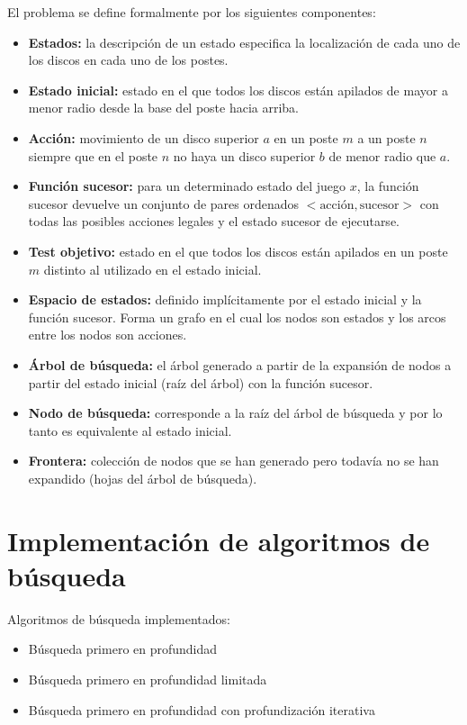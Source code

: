 \documentclass[onecolumn]{IEEEtran}
\begin{document}
El problema se define formalmente por los siguientes componentes:
\begin{itemize}
    \item \textbf{Estados:} la descripción de un estado especifica la localización de cada uno de los discos en cada uno de los postes.
    \item \textbf{Estado inicial:} estado en el que todos los discos están apilados de mayor a menor radio desde la base del poste hacia arriba.
    \item \textbf{Acción:} movimiento de un disco superior $a$ en un poste $m$ a un poste $n$ siempre que en el poste $n$ no haya un disco superior $b$ de menor radio que $a$.
    \item \textbf{Función sucesor:} para un determinado estado del juego $x$, la función sucesor devuelve un conjunto de pares ordenados $<\text{acción}, \text{sucesor}>$ con todas las posibles acciones legales y el estado sucesor de ejecutarse.
    \item \textbf{Test objetivo:} estado en el que todos los discos están apilados en un poste $m$ distinto al utilizado en el estado inicial.
    \item \textbf{Espacio de estados:} definido implícitamente por el estado inicial y la función sucesor. Forma un grafo en el cual los nodos son estados y los arcos entre los nodos son acciones.
    \item \textbf{Árbol de búsqueda:} el árbol generado a partir de la expansión de nodos a partir del estado inicial (raíz del árbol) con la función sucesor.
    \item \textbf{Nodo de búsqueda:} corresponde a la raíz del árbol de búsqueda y por lo tanto es equivalente al estado inicial.
    \item \textbf{Frontera:} colección de nodos que se han generado pero todavía no se han expandido (hojas del árbol de búsqueda).
\end{itemize}

\section{Implementación de algoritmos de búsqueda}

Algoritmos de búsqueda implementados:
\begin{itemize}
    \item Búsqueda primero en profundidad
    \item Búsqueda primero en profundidad limitada
    \item Búsqueda primero en profundidad con profundización iterativa
\end{itemize}
\end{document}
